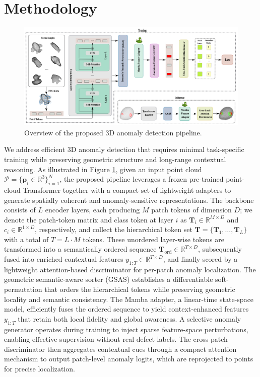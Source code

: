 \section{Methodology}

\begin{figure}[h!]
  \centering 
    \includegraphics[width=0.98\linewidth]{figs/overview}
  \caption{Overview of the proposed 3D anomaly detection pipeline.}
  \label{fig:overview}
\end{figure}

We address efficient 3D anomaly detection that requires minimal task-specific training while preserving geometric structure and long-range contextual reasoning. As illustrated in Figure \ref{fig:overview}, given an input point cloud \(\mathcal{P} = \{\mathbf{p}_i \in \mathbb{R}^3\}_{i=1}^N\), the proposed pipeline leverages a frozen pre-trained point-cloud Transformer together with a compact set of lightweight adapters to generate spatially coherent and anomaly-sensitive representations. The backbone consists of \(L\) encoder layers, each producing \(M\) patch tokens of dimension \(D\); we denote the patch-token matrix and class token at layer \(i\) as \(\mathbf{T}_i \in \mathbb{R}^{M\times D}\) and \(c_i \in \mathbb{R}^{1\times D}\), respectively, and collect the hierarchical token set \(\mathbf{T} = \{\mathbf{T}_1, \dots, \mathbf{T}_L\}\) with a total of \(T = L \cdot M\) tokens. These unordered layer-wise tokens are transformed into a semantically ordered sequence \(\mathbf{T}_{\mathrm{ord}} \in \mathbb{R}^{T\times D}\), subsequently fused into enriched contextual features \(y_{1:T} \in \mathbb{R}^{T\times D}\), and finally scored by a lightweight attention-based discriminator for per-patch anomaly localization. The geometric semantic-aware sorter (GSAS) establishes a differentiable soft-permutation that orders the hierarchical tokens while preserving geometric locality and semantic consistency. The Mamba adapter, a linear-time state-space model, efficiently fuses the ordered sequence to yield context-enhanced features \(y_{1:T}\) that retain both local fidelity and global awareness. A selective anomaly generator operates during training to inject sparse feature-space perturbations, enabling effective supervision without real defect labels. The cross-patch discriminator then aggregates contextual cues through a compact attention mechanism to output patch-level anomaly logits, which are reprojected to points for precise localization. 

